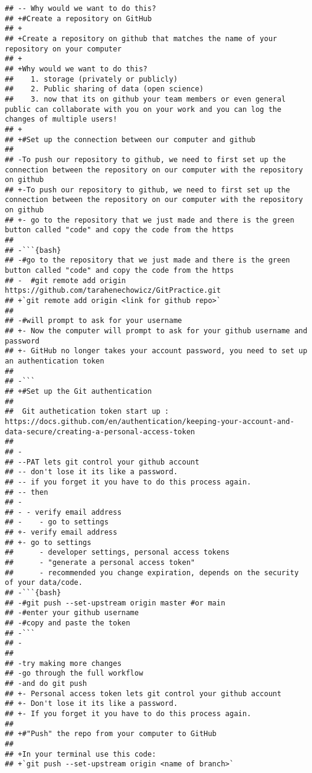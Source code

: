 \documentclass[]{article}
\begin{document}
\begin{verbatim}
## -- Why would we want to do this? 
## +#Create a repository on GitHub
## +
## +Create a repository on github that matches the name of your repository on your computer
## +
## +Why would we want to do this? 
##    1. storage (privately or publicly)
##    2. Public sharing of data (open science)
##    3. now that its on github your team members or even general public can collaborate with you on your work and you can log the changes of multiple users!
## +  
## +#Set up the connection between our computer and github
##  
## -To push our repository to github, we need to first set up the connection between the repository on our computer with the repository on github
## +-To push our repository to github, we need to first set up the connection between the repository on our computer with the repository on github
## +- go to the repository that we just made and there is the green button called "code" and copy the code from the https
##  
## -```{bash}
## -#go to the repository that we just made and there is the green button called "code" and copy the code from the https
## -  #git remote add origin https://github.com/tarahenechowicz/GitPractice.git
## +`git remote add origin <link for github repo>`
##  
## -#will prompt to ask for your username
## +- Now the computer will prompt to ask for your github username and password
## +- GitHub no longer takes your account password, you need to set up an authentication token
##  
## -```
## +#Set up the Git authentication 
##  
##  Git authetication token start up : https://docs.github.com/en/authentication/keeping-your-account-and-data-secure/creating-a-personal-access-token
##  
## -
## --PAT lets git control your github account
## -- don't lose it its like a password. 
## -- if you forget it you have to do this process again.
## -- then 
## -
## - - verify email address
## -    - go to settings
## +- verify email address
## +- go to settings
##      - developer settings, personal access tokens
##      - "generate a personal access token"
##      - recommended you change expiration, depends on the security of your data/code. 
## -```{bash}
## -#git push --set-upstream origin master #or main
## -#enter your github username
## -#copy and paste the token
## -```
## - 
##  
## -try making more changes
## -go through the full workflow
## -and do git push
## +- Personal access token lets git control your github account
## +- Don't lose it its like a password. 
## +- If you forget it you have to do this process again.
##  
## +#"Push" the repo from your computer to GitHub
##  
## +In your terminal use this code: 
## +`git push --set-upstream origin <name of branch>`

\end{verbatim}
\end{document}
